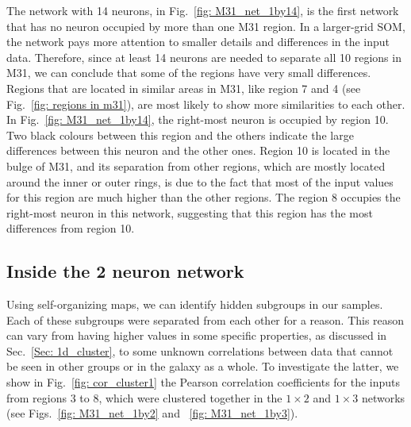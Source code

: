         The network with 14 neurons, in Fig.~\ref{fig: M31_net_1by14}, is the first network that has no neuron occupied by more than one M31 region.
        In a larger-grid SOM, the network pays more attention to smaller details and differences in the input data.
        Therefore, since at least 14 neurons are needed to separate all 10 regions in M31, we can conclude that some of the regions have very small differences.
        Regions that are located in similar areas in M31, like region 7 and 4 (see Fig.~\ref{fig: regions in m31}), are most likely to show more similarities to each other.
        In Fig.~\ref{fig: M31_net_1by14}, the right-most neuron is occupied by region 10.
        Two black colours between this region and the others indicate the large differences between this neuron and the other ones.
       Region 10 is located in the bulge of M31, and its separation from other regions, which are mostly located around the inner or outer rings, is due to the fact that most of the input values for this region are much higher than the other regions. %
        The region 8 occupies the right-most neuron in this network, suggesting that this region has the most differences from region 10.
        
        
    \subsection{Inside the 2 neuron network}%
        \label{sec: inside_the_2_neurons}
        Using self-organizing maps, we can identify hidden subgroups in our samples. 
        Each of these subgroups were separated from each other for a reason.
        This reason can vary from having higher values in some specific properties, as discussed in Sec.~\ref{Sec: 1d_cluster}, to some unknown correlations between data that cannot be seen in other groups or in the galaxy as a whole.
        To investigate the latter, we show in Fig.~\ref{fig: cor_cluster1} the Pearson correlation coefficients for the inputs from regions 3 to 8, which were clustered together in the $1\times2$ and $1\times3$ networks (see Figs.~\ref{fig: M31_net_1by2} and ~\ref{fig: M31_net_1by3}).
        
